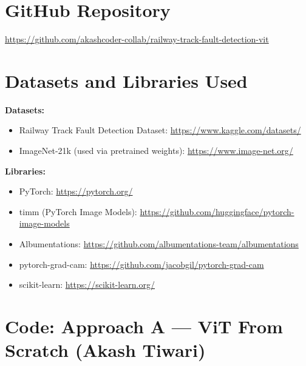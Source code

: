 \documentclass[10pt,twocolumn,letterpaper]{article}
\begin{document}
\clearpage
\onecolumn
\appendix

\section{GitHub Repository}
\begin{center}
\url{https://github.com/akashcoder-collab/railway-track-fault-detection-vit}
\end{center}

\section{Datasets and Libraries Used}
\textbf{Datasets:}
\begin{itemize}
    \item Railway Track Fault Detection Dataset: \url{https://www.kaggle.com/datasets/}
    \item ImageNet-21k (used via pretrained weights): \url{https://www.image-net.org/}
\end{itemize}

\textbf{Libraries:}
\begin{itemize}
    \item PyTorch: \url{https://pytorch.org/}
    \item timm (PyTorch Image Models): \url{https://github.com/huggingface/pytorch-image-models}
    \item Albumentations: \url{https://github.com/albumentations-team/albumentations}
    \item pytorch-grad-cam: \url{https://github.com/jacobgil/pytorch-grad-cam}
    \item scikit-learn: \url{https://scikit-learn.org/}
\end{itemize}


\section{Code: Approach A --- ViT From Scratch (Akash Tiwari)}
\end{document}
